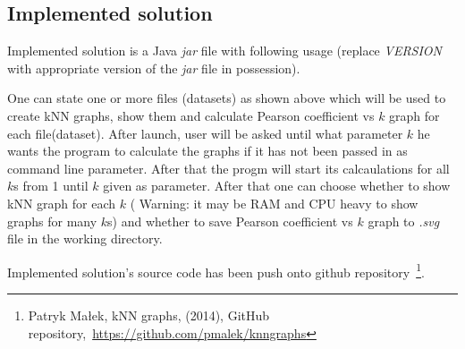 \begin{filecode}[label=lst:pearsonCorrelation,caption=Method used for Pearson correlation coefficient calculation.]
  \label{lst:pearsons_method}
  
\end{filecode}

\subsection{Implemented solution}
Implemented solution is a Java \emph{jar} file with following usage (replace \emph{VERSION} with appropriate version of the \emph{jar} file in possession).


One can state one or more files (datasets) as shown above which will be used to create kNN graphs, show them and calculate Pearson coefficient vs $k$ graph for each file(dataset).
After launch, user will be asked until what parameter $k$ he wants the program to calculate the graphs if it has not been passed in as command line parameter.
After that the progm will start its calcaulations for all $k$s from 1 until $k$ given as parameter.
After that one can choose whether to show kNN graph for each $k$ ( Warning: it may be RAM and CPU heavy to show graphs for many $k$s) and whether to save Pearson coefficient vs $k$ graph to \emph{.svg} file in the working directory.

Implemented solution's source code has been push onto github repository~\footnote{Patryk Małek, kNN graphs, (2014), GitHub repository,~\url{https://github.com/pmalek/knngraphs}}.